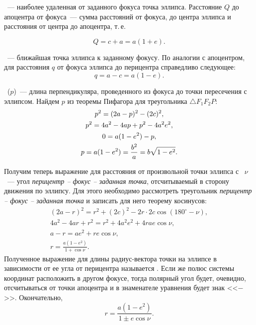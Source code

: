 ~--- наиболее удаленная от заданного фокуса точка эллипса. Расстояние $Q$ до апоцентра от фокуса~--- сумма расстояний от фокуса, до центра эллипса и расстояния от центра до апоцентра, т.\,е.

\begin{equation}
	Q = c + a = a (1 + e).
\end{equation}

~--- ближайшая точка эллипса к заданному фокусу. По аналогии с апоцентром, для расстояния $q$ от фокуса эллипса до перицентра справедливо следующее:
\begin{equation}
	q = a - c = a (1 - e).
\end{equation}

~($p$)~--- длина перпендикуляра, проведенного из фокуса до точки пересечения с эллипсом. Найдем $p$ из теоремы Пифагора для треугольника $\triangle F_1 F_2 P$:
\begin{gather}
	p^2 = (2a - p)^2 - (2c)^2, \notag\\
	p^2 =  4a^2 - 4ap + p^2 - 4a^2e^2,\notag\\
	0 = a ( 1 - e^2) - p,\notag\\
	p = a (1 - e^2) = \frac{b^2}{a} = b \sqrt{1 - e^2}.
\end{gather}

Получим теперь выражение для расстояния от произвольной точки эллипса с ~$\nu$~--- угол
{\slshape перицентр -- фокус -- заданная точка},
отсчитываемый в сторону движения по эллипсу. Для этого необходимо рассмотреть треугольник {\slshape перицентр -- фокус -- заданная точка} и записать для него теорему косинусов:
\begin{gather*}
	(2a - r)^2 = r^2 + (2c)^2 - 2 r \cdot 2c \cos (180^\circ - \nu),\\
	4a^2 - 4ar + r^2 = r^2 + 4 a^2 e^2 + 4 r a e \cos \nu,\\
	a - r = ae^2 + re\cos \nu,\\
	r = \frac{a(1 - e^2)}{1 + \cos \nu}.
\end{gather*}
Полученное выражение для длины радиус-вектора точки на эллипсе в зависимости от ее угла от перицентра называется . Если же полюс системы координат расположить в другом фокусе, тогда полярный угол будет, очевидно, отсчитываться от точки апоцентра и в знаменателе уравнения будет знак <<$-$>>. Окончательно,
\begin{equation}
	r = \frac{a ( 1- e^2)}{1 \pm e \cos \nu}.
	\label{eq:ell-eq-pol}
\end{equation}

